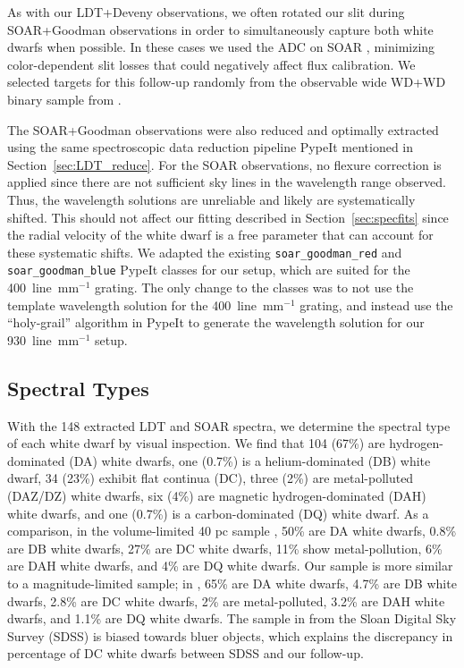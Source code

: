 \documentclass[twocolumn]{aastex631}
\begin{document}
As with our LDT+Deveny observations, we often rotated our slit during SOAR+Goodman observations in order to simultaneously capture both white dwarfs when possible. In these cases we used the ADC on SOAR \citep{2018SPIE10700E..3ZB}, minimizing color-dependent slit losses that could negatively affect flux calibration. We selected targets for this follow-up randomly from the observable wide WD+WD binary sample from \cite{2018MNRAS.480.4884E}.

The SOAR+Goodman observations were also reduced and optimally extracted using the same spectroscopic data reduction pipeline PypeIt \citep{2020JOSS....5.2308P} mentioned in Section~\ref{sec:LDT_reduce}. For the SOAR observations, no flexure correction is applied since there are not sufficient sky lines in the wavelength range observed. Thus, the wavelength solutions are unreliable and likely are systematically shifted. This should not affect our fitting described in Section~\ref{sec:specfits} since the radial velocity of the white dwarf is a free parameter that can account for these systematic shifts. We adapted the existing \texttt{soar\_goodman\_red} and \texttt{soar\_goodman\_blue} PypeIt classes for our setup, which are suited for the 400~line~mm$^{-1}$ grating. The only change to the classes was to not use the template wavelength solution for the 400~line~mm$^{-1}$ grating, and instead use the ``holy-grail'' algorithm in PypeIt to generate the wavelength solution for our 930~line~mm$^{-1}$ setup.

\subsection{Spectral Types}\label{sec:spectypes}
With the 148 extracted LDT and SOAR spectra, we determine the spectral type of each white dwarf by visual inspection. We find that 104 (67\%) are hydrogen-dominated (DA) white dwarfs, one (0.7\%) is a helium-dominated (DB) white dwarf, 34 (23\%) exhibit flat continua (DC), three (2\%) are metal-polluted (DAZ/DZ) white dwarfs, six (4\%) are magnetic hydrogen-dominated (DAH) white dwarfs, and one (0.7\%) is a carbon-dominated (DQ) white dwarf. As a comparison, in the volume-limited 40 pc sample \citep{2024MNRAS.527.8687O}, 50\% are DA white dwarfs, 0.8\% are DB white dwarfs, 27\% are DC white dwarfs, 11\% show metal-pollution, 6\% are DAH white dwarfs, and 4\% are DQ white dwarfs. Our sample is more similar to a magnitude-limited sample; in \cite{2013ApJS..204....5K}, 65\% are DA white dwarfs, 4.7\% are DB white dwarfs, 2.8\% are DC white dwarfs, 2\% are metal-polluted, 3.2\% are DAH white dwarfs, and 1.1\% are DQ white dwarfs. The sample in \cite{2013ApJS..204....5K} from the Sloan Digital Sky Survey (SDSS) is biased towards bluer objects, which explains the discrepancy in percentage of DC white dwarfs between SDSS and our follow-up. 
\end{document}
